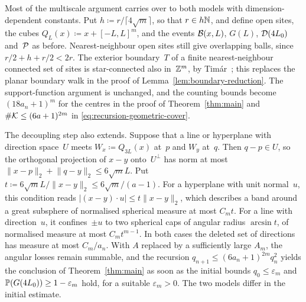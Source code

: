 \documentclass[11pt,letterpaper]{article}
\begin{document}
Most of the multiscale argument carries over to both models with dimension-dependent constants. Put $h\coloneqq r/\lceil4\sqrt m\rceil$, so that $r\in h\N$, and define open sites, the cubes $Q_L(x)\coloneqq x+[-L,L]^m$, and the events $\cB(x,L)$, $G(L)$, $\cD(4L_0)$ and~$\cP$ as before. Nearest-neighbour open sites still give overlapping balls, since $r/2+h+r/2<2r$. The exterior boundary~$T$ of a finite nearest-neighbour connected set of sites is star-connected also in~$\Z^m$, by Tim\'ar~\cite{Tim13}; this replaces the planar boundary walk in the proof of Lemma~\ref{lem:boundary-reduction}. The support-function argument is unchanged, and the counting bounds become $(18a_n+1)^m$ for the centres in the proof of Theorem~\ref{thm:main} and $\#\cK\le(6a+1)^{2m}$ in \eqref{eq:recursion-geometric-cover}.

The decoupling step also extends. Suppose that a line or hyperplane with direction space~$U$ meets $W_x\coloneqq Q_{3L}(x)$ at~$p$ and $W_y$ at~$q$. Then $q-p\in U$, so the orthogonal projection of $x-y$ onto~$U^\perp$ has norm at most $\lVert x-p\rVert_2+\lVert q-y\rVert_2\le6\sqrt mL$. Put $t\coloneqq6\sqrt mL/\lVert x-y\rVert_2\le6\sqrt m/(a-1)$. For a hyperplane with unit normal~$u$, this condition reads $\lvert(x-y)\cdot u\rvert\le t\lVert x-y\rVert_2$, which describes a band around a great subsphere of normalised spherical measure at most $C_mt$. For a line with direction~$u$, it confines~$\pm u$ to two spherical caps of angular radius $\arcsin t$, of normalised measure at most $C_mt^{m-1}$. In both cases the deleted set of directions has measure at most $C_m/a_n$. With $A$ replaced by a sufficiently large $A_m$, the angular losses remain summable, and the recursion $q_{n+1}\le(6a_n+1)^{2m}q_n^2$ yields the conclusion of Theorem~\ref{thm:main} as soon as the initial bounds $q_0\le\varepsilon_m$ and $\P(G(4L_0))\ge1-\varepsilon_m$ hold, for a suitable $\varepsilon_m>0$. The two models differ in the initial estimate.
\end{document}
